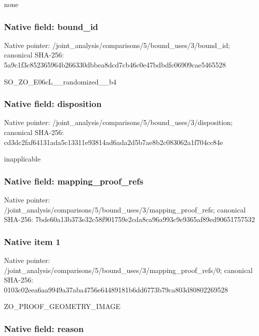 \documentclass[10pt,a4paper]{article}
\begin{document}
none


\subsubsection{Native field: bound\_id}


Native pointer: /joint\_analysis/comparis\allowbreak{}ons/5/bound\_uses/3/bound\allowbreak{}\_id; canonical SHA-256: 5a9c1f3c852365964b266330\allowbreak{}dbbea8dcd7cb46c0e47bdbdf\allowbreak{}c06909cae5465528


SO\_ZO\_E06cL\_\_randomized\_\_b4


\subsubsection{Native field: disposition}


Native pointer: /joint\_analysis/comparis\allowbreak{}ons/5/bound\_uses/3/dispo\allowbreak{}sition; canonical SHA-256: cd3dc2faf64131ada5c13311\allowbreak{}e93814ad6ada2d5b7ae8b2c0\allowbreak{}83062a1f704cc84e


inapplicable


\subsubsection{Native field: mapping\_proof\_refs}


Native pointer: /joint\_analysis/comparis\allowbreak{}ons/5/bound\_uses/3/mappi\allowbreak{}ng\_proof\_refs; canonical SHA-256: 7bde60a13b373e32c58f9017\allowbreak{}59e2cda8ca96a993c9e9365a\allowbreak{}f89ed90651757532



\subsubsection{Native item 1}


Native pointer: /joint\_analysis/comparis\allowbreak{}ons/5/bound\_uses/3/mappi\allowbreak{}ng\_proof\_refs/0; canonical SHA-256: 0103c02eea6aa9949a37aba4\allowbreak{}756e64489181b6dd6773b79c\allowbreak{}a803d80802269528


ZO\_PROOF\_GEOMETRY\_IMAGE


\subsubsection{Native field: reason}
\end{document}
